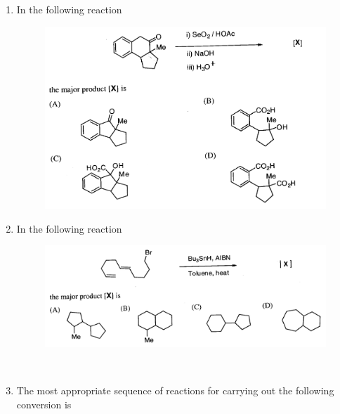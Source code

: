 \documentclass[journal,12pt,onecolumn]{IEEEtran}
\theoremstyle{remark}
\begin{document}
\begin{enumerate}
 

\item    \hspace{0.5cm} In the following reaction  \hfill{}

\begin{figure}
    \centering
    \includegraphics[width=\textwidth]{figs/image13.png}
    \caption{}
    \label{fig:figure13}
\end{figure}


 

\item    \hspace{0.5cm} In the following reaction  \hfill{}

\begin{figure}
    \centering
    \includegraphics[width=\textwidth]{figs/image14.png}
    \caption{}
    \label{fig:figure14}
\end{figure}

 

\newpage
\


\item    \hspace{0.5cm} The most appropriate sequence of reactions for carrying out the following conversion is  \hfill{}


\end{enumerate}
\end{document}
